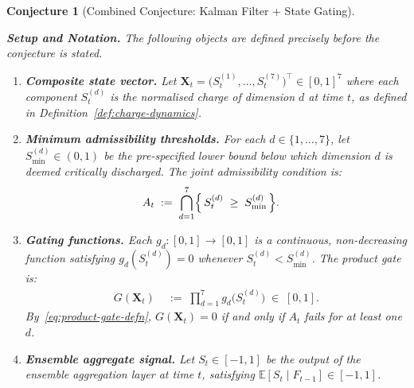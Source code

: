 \documentclass[12pt,openany]{book}
\numberwithin{equation}{chapter}
\theoremstyle{plain}
\newtheorem{conjecture}[theorem]{Conjecture}
\theoremstyle{definition}
\theoremstyle{remark}
\def\mathcal#1{#1}%
\begin{document}
\begin{conjecture}[Combined Conjecture: Kalman Filter + State Gating]
\label{conj:combined}

\noindent\textbf{Setup and Notation.}
The following objects are defined precisely before the
conjecture is stated.

\begin{enumerate}
  \item \textbf{Composite state vector.}
        Let $\mathbf{X}_t = \bigl(\mathcal{S}_t^{(1)},\ldots,
        \mathcal{S}_t^{(7)}\bigr)^\top \in [0,1]^7$
        where each component $\mathcal{S}_t^{(d)}$ is the
        normalised charge of dimension $d$ at time $t$, as
        defined in Definition~\ref{def:charge-dynamics}.

  \item \textbf{Minimum admissibility thresholds.}
        For each $d \in \{1,\ldots,7\}$, let
        $\mathcal{S}_{\min}^{(d)} \in (0,1)$ be the
        pre-specified lower bound below which dimension $d$
        is deemed critically discharged.  The joint
        admissibility condition is:
        \begin{align}
          \mathcal{A}_t
          &\;:=\;
          \bigcap_{d=1}^{7}
          \Bigl\{\,\mathcal{S}_t^{(d)}
            \;\geq\; \mathcal{S}_{\min}^{(d)}\,\Bigr\}.
          \label{eq:admissibility-set}
        \end{align}

  \item \textbf{Gating functions.}
        Each $g_d : [0,1] \to [0,1]$ is a continuous,
        non-decreasing function satisfying
        $g_d(\mathcal{S}_t^{(d)}) = 0$ whenever
        $\mathcal{S}_t^{(d)} < \mathcal{S}_{\min}^{(d)}$.
        The product gate is:
        \begin{align}
          G(\mathbf{X}_t)
          &\;:=\; \prod_{d=1}^{7} g_d\!\bigl(\mathcal{S}_t^{(d)}\bigr)
          \;\in\; [0,1].
          \label{eq:product-gate-defn}
        \end{align}
        By~\eqref{eq:product-gate-defn}, $G(\mathbf{X}_t)=0$
        if and only if $\mathcal{A}_t$ fails for at least one $d$.

  \item \textbf{Ensemble aggregate signal.}
        Let $S_t \in [-1,1]$ be the output of the ensemble
        aggregation layer at time $t$, satisfying
        $\mathbb{E}[S_t \mid \mathcal{F}_{t-1}] \in [-1,1]$.


\end{enumerate}
\end{conjecture}
\end{document}
